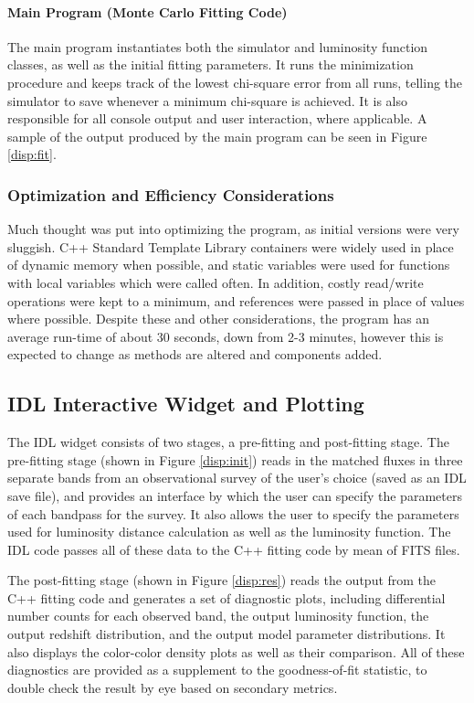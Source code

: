 \documentclass[twocolumn,letterpaper,10pt]{article}
\begin{document}
\paragraph{Main Program (Monte Carlo Fitting Code)}

The main program instantiates both the simulator and luminosity function classes, as well as the initial fitting parameters. It runs the minimization procedure and keeps track of the lowest chi-square error from all runs, telling the simulator to save whenever a minimum chi-square is achieved. It is also responsible for all console output and user interaction, where applicable. A sample of the output produced by the main program can be seen in Figure \ref{disp:fit}.

\subsubsection{Optimization and Efficiency Considerations}

Much thought was put into optimizing the program, as initial versions were very sluggish. C++ Standard Template Library containers were widely used in place of dynamic memory when possible, and static variables were used for functions with local variables which were called often. In addition, costly read/write operations were kept to a minimum, and references were passed in place of values where possible. Despite these and other considerations, the program has an average run-time of about 30 seconds, down from 2-3 minutes, however this is expected to change as methods are altered and components added.

\subsection{IDL Interactive Widget and Plotting}

The IDL widget consists of two stages, a pre-fitting and post-fitting stage. The pre-fitting stage (shown in Figure \ref{disp:init}) reads in the matched fluxes in three separate bands from an observational survey of the user's choice (saved as an IDL save file), and provides an interface by which the user can specify the parameters of each bandpass for the survey. It also allows the user to specify the parameters used for luminosity distance calculation as well as the luminosity function. The IDL code passes all of these data to the C++ fitting code by mean of FITS files.

The post-fitting stage (shown in Figure \ref{disp:res}) reads the output from the C++ fitting code and generates a set of diagnostic plots, including differential number counts for each observed band, the output luminosity function, the output redshift distribution, and the output model parameter distributions. It also displays the color-color density plots as well as their comparison. All of these diagnostics are provided as a supplement to the goodness-of-fit statistic, to double check the result by eye based on secondary metrics.
\end{document}
